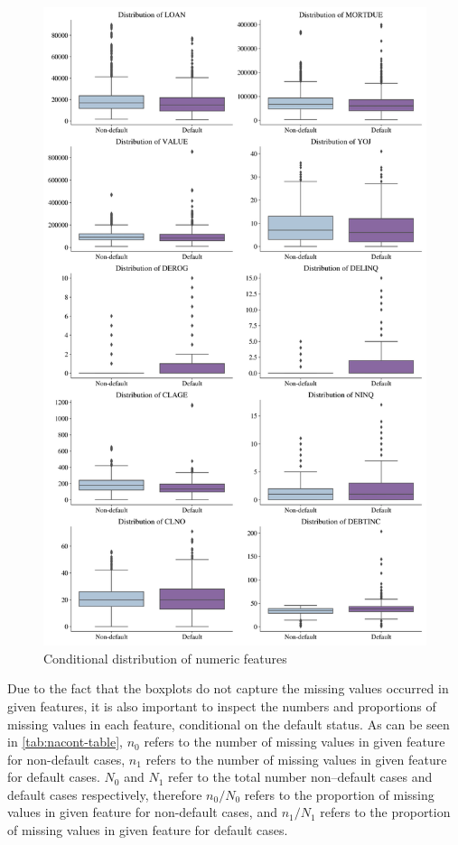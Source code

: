 \begin{figure}[H]
    \centering
    \caption{Conditional distribution of numeric features}\vspace{0.5em}
    \label{fig:boxfeat}
    \includegraphics[width=140mm]{Figures/Numeric_Features_Distribution_Boxplots.jpg}
    \vspace{-1em}
\end{figure}

Due to the fact that the boxplots do not capture the missing values occurred in given features, it is also important to inspect the numbers and proportions of missing values in each feature, conditional on the default status.
As can be seen in \autoref{tab:nacont-table}, $n_0$ refers to the number of missing values in given feature for non-default cases, $n_1$ refers to the number of missing values in given feature for default cases.
$N_0$ and $N_1$ refer to the total number non--default cases and default cases respectively, therefore $n_0/N_0$ refers to the proportion of missing values in given feature for non-default cases, and $n_1/N_1$ refers to the proportion of missing values in given feature for default cases.

